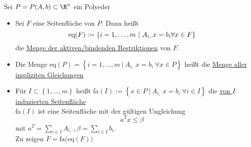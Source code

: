\begin{definition}
	Sei $P = P(A,b) \subset \R^n$ ein Polyeder
	\begin{itemize}
		\item Sei $F$ eine Seitenfläche von $P$. Dann heißt
			\begin{equation*}
				\eq(F):=\left\{ i = 1,\dots ,m\ |\ A_{i,\cdot}x = b_{i} \forall x \in F \right\}
			\end{equation*}
			die \underline{Menge der aktiven/bindenden Restriktionen} von $F$.
		\item Die Menge eq$(P) = \left\{ i =1,\dots ,m \ |\ A_{i,\cdot}x =b_{i} \ \forall x \in P \right\}$ heißt die \underline{Menge aller impliziten Gleichungen}
		\item Für $I \subset  \left\{ 1,\dots ,m \right\}$ heißt fa$(I):=\left\{x \in P \ |\ A_{i,\cdot}x = b_{i} \ \forall i \in I \right\}$ die \underline{von $I$ induzierten Seitenfläche}\\
			fa$(I)$ ist eine Seitenfläche mit der gültigen Ungleichung
			\begin{equation*}
				a^{T} x \leq \beta
			\end{equation*}
			mit $a^{T} = \sum\limits_{i \in I}^{} A_{i,\cdot}, \beta = \sum\limits_{i \in I}^{} b_{i}$.\\
			Zu zeigen $F = \text{fa(eq}(F))$
	\end{itemize}
	
\end{definition}


